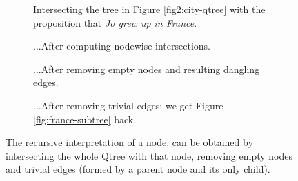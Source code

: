 \begin{figure}[H]
	\centering
	\begin{subfigure}[t]{\linewidth}
		\centering
		\caption{Intersecting the tree in Figure \ref{fig2:city-qtree} with the proposition that \textit{Jo grew up in France}.}
	\end{subfigure}
	
	\begin{subfigure}[t]{.33\linewidth}
		\centering		{}
		\caption{...After computing nodewise intersections.}
	\end{subfigure}
	\hfill
	\begin{subfigure}[t]{.27\linewidth}
		\centering		{}
		\caption{...After removing empty nodes and resulting dangling edges.}
	\end{subfigure}
	\hfill
	\begin{subfigure}[t]{.3\linewidth}
		\centering 		{}
		\caption{...After removing trivial edges: we get Figure \ref{fig:france-subtree} back.}
	\end{subfigure}
	\caption{The recursive interpretation of a node, can be obtained by intersecting the whole Qtree with that node, removing empty nodes and trivial edges (formed by a parent node and its only child).}\label{fig:tree-node-inter}
\end{figure}

